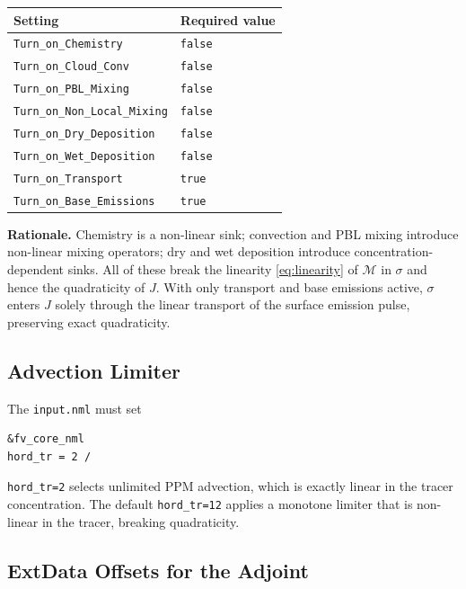 \documentclass[12pt]{article}
\begin{document}
\begin{table}[h!]
\centering
\begin{tabular}{ll}
\toprule
Setting & Required value \\
\midrule
\texttt{Turn\_on\_Chemistry}         & \texttt{false} \\
\texttt{Turn\_on\_Cloud\_Conv}       & \texttt{false} \\
\texttt{Turn\_on\_PBL\_Mixing}       & \texttt{false} \\
\texttt{Turn\_on\_Non\_Local\_Mixing}& \texttt{false} \\
\texttt{Turn\_on\_Dry\_Deposition}   & \texttt{false} \\
\texttt{Turn\_on\_Wet\_Deposition}   & \texttt{false} \\
\texttt{Turn\_on\_Transport}         & \texttt{true} \\
\texttt{Turn\_on\_Base\_Emissions}   & \texttt{true} \\
\bottomrule
\end{tabular}
\end{table}

\textbf{Rationale.} Chemistry is a non-linear sink; convection and PBL mixing
introduce non-linear mixing operators; dry and wet deposition introduce
concentration-dependent sinks.  All of these break the linearity
\eqref{eq:linearity} of $\mathcal{M}$ in $\sigma$ and hence the quadraticity
of $J$.  With only transport and base emissions active, $\sigma$ enters $J$
solely through the linear transport of the surface emission pulse, preserving
exact quadraticity.

\subsection{Advection Limiter}

The \texttt{input.nml} must set

\begin{lstlisting}
&fv_core_nml
hord_tr = 2 /
\end{lstlisting}

\texttt{hord\_tr=2} selects unlimited PPM advection, which is exactly linear in
the tracer concentration.  The default \texttt{hord\_tr=12} applies a monotone
limiter that is non-linear in the tracer, breaking quadraticity.

\subsection{ExtData Offsets for the Adjoint}
\end{document}
